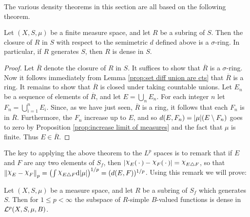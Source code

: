 The various density theorems in this section are all based on the following theorem.

\begin{theorem}
\label{thm:closure of subring}
Let $(X,S,\mu)$ be a finite measure space, and let $R$ be a subring of $S$. Then the closure of $R$ in $S$ with respect to the semimetric $d$ defined above is a $\sigma$-ring. In particular, if $R$ generates $S$, then $R$ is dense in $S$.
\end{theorem}

\begin{proof}
Let $\overline{R}$ denote the closure of $R$ in $S$. It suffices to show that $\overline{R}$ is a $\sigma$-ring. Now it follows immediately from Lemma \ref{prop:set diff union are cts} that $\overline{R}$ is a ring. It remains to show that $\overline{R}$ is closed under taking countable unions. Let $E_n$ be a sequence of elements of $\overline{R}$, and let $E=\bigcup_nE_n$. For each integer $n$ let $F_n=\bigcup_{i=1}^nE_i$. Since, as we have just seen, $\overline{R}$ is a ring, it follows that each $F_n$ is in $\overline{R}$. Furthermore, the $F_n$ increase up to $E$, and so $d(E,F_n)=|\mu|(E\setminus F_n)$ goes to zero by Proposition \ref{prop:increase limit of measures} and the fact that $\mu$ is finite. Thus $E\in\overline{R}$.
\end{proof}

The key to applying the above theorem to the $L^p$ spaces is to remark that if $E$ and $F$ are any two elements of $S_f$, then $|\idf{E}(\imarg)-\idf{F}(\imarg)|=\idf{E\symd F}$, so that $\norm{\idf{E}-\idf{F}}_p=\br{\int\idf{E\symd F}\dd|\mu|}^{1/p}=(d(E,F))^{1/p}$. Using this remark we will prove:

\begin{theorem}
\label{thm:R ISF dense in Lp}
Let $(X,S,\mu)$ be a measure space, and let $R$ be a subring of $S_f$ which generates $S$. Then for $1\leq p<\infty$ the subspace of $R$-simple $B$-valued functions is dense in ${\cal L}^p(X,S,\mu,B)$.
\end{theorem}

